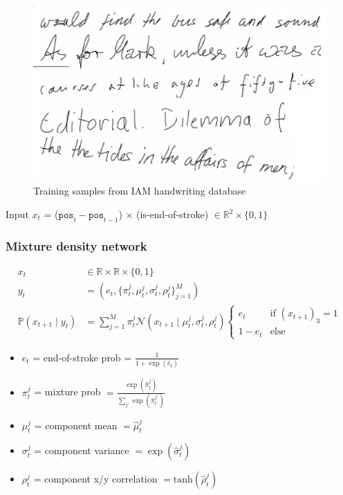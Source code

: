 \documentclass[10pt,xcolor=dvipsnames]{beamer}
\begin{document}
\begin{frame}
  \begin{figure}
    \centering
  \includegraphics[width=.75\linewidth]{fig/fig9.png}
    \caption{Training samples from IAM handwriting database}
    \label{fig:fig9}
  \end{figure}
Input $x_t$ = ($\texttt{pos}_t - \texttt{pos}_{t-1}$) $\times$
(is-end-of-stroke) $ \in \mathbb{R}^2 \times \{0,1\}$
\end{frame}

\begin{frame}
  \frametitle{Mixture density network}
  \begin{align*}
   x_t &\in \mathbb{R} \times \mathbb{R} \times \{0,1\}  \\
    y_t &= (e_t, \{\pi^j_t, \mu^j_t, \sigma^j_t, \rho^j_t\}_{j=1}^M) \\
    \mathbb{P}(x_{t+1} \mid y_t) &= \sum_{j=1}^M \pi^j_t \mathcal{N}(x_{t+1} \mid \mu^j_t, \sigma^j_t, \rho^j_t)
    \begin{cases}
      e_t & \text{if } (x_{t+1})_3 = 1 \\
      1-e_t & \text{else}
    \end{cases}
  \end{align*}

  \begin{itemize}
  \item $e_t$ = end-of-stroke prob = $\frac1{1+\exp(\hat{e}_t)}$
  \item $\pi^j_t$ = mixture prob $= \frac{\exp(\hat{\pi}_t^j)}{\sum_{j'}\exp(\hat{\pi}_t^{j'})}$
  \item $\mu^j_t$ = component mean $= \hat{\mu}^j_t$
  \item $\sigma^j_t$ = component variance $= \exp(\hat{\sigma}_t^j)$
  \item $\rho^j_t$ = component x/y correlation $= \text{tanh}(\hat{\rho}^j_t)$
  \end{itemize}
\end{frame}
\end{document}
